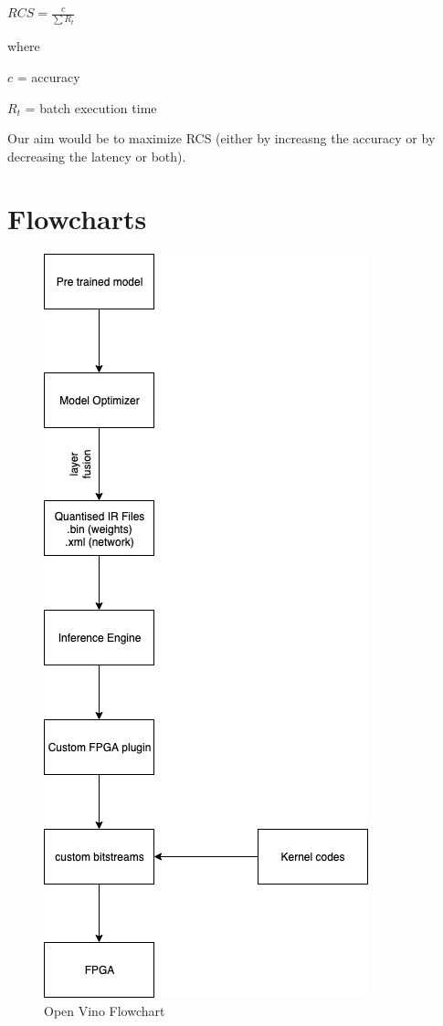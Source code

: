 \documentclass[titlepage]{report}
\begin{document}
\begin{itemize}
$RCS = \frac{c}{\sum R_t}$    

where   

$c$ = accuracy    

      $R_t$ = batch execution time  
      
Our aim would be to maximize RCS (either by increasng the accuracy or by decreasing the latency or both).


\chapter{Flowcharts}

\begin{figure}[h!]
    \centering
    \includegraphics[scale=0.65]{open_vino_flowchart.jpg}
    \caption{Open Vino Flowchart}
\end{figure}


\end{itemize}
\end{document}
